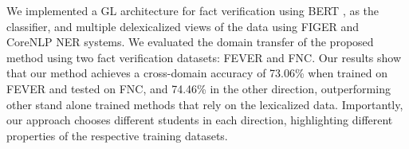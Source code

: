 
{} We implemented a GL architecture for fact verification using 
BERT \citep{devlin-etal-2019-bert}, as the classifier, and multiple delexicalized views of the data using FIGER and CoreNLP NER systems. %
We evaluated the domain transfer of the proposed method using two fact verification datasets: FEVER and FNC.
Our results show that our method achieves a cross-domain accuracy of 73.06\% when trained on FEVER and tested on FNC, and 74.46\% in the other direction, outperforming other stand alone trained methods that rely on the lexicalized data. Importantly, our approach chooses different students in each direction, highlighting different properties of the respective training datasets.


